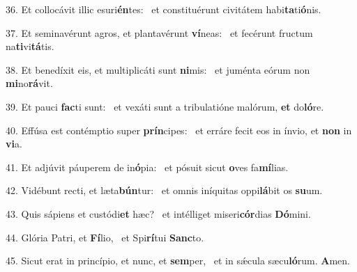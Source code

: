 36. Et collocávit illic esuri\textbf{én}tes: \ast\  et constituérunt civitátem habi\textbf{ta}ti\textbf{ó}nis.\

37. Et seminavérunt agros, et plantavérunt \textbf{ví}neas: \ast\  et fecérunt fructum na\textbf{ti}vi\textbf{tá}tis.\

38. Et benedíxit eis, et multiplicáti sunt \textbf{ni}mis: \ast\  et juménta eórum non \textbf{mi}no\textbf{rá}vit.\

39. Et pauci \textbf{fac}ti sunt: \ast\  et vexáti sunt a tribulatióne malórum, \textbf{et} do\textbf{ló}re.\

40. Effúsa est contémptio super \textbf{prín}cipes: \ast\  et erráre fecit eos in ínvio, et \textbf{non} in \textbf{vi}a.\

41. Et adjúvit páuperem de in\textbf{ó}pia: \ast\  et pósuit sicut \textbf{o}ves fa\textbf{mí}lias.\

42. Vidébunt recti, et læta\textbf{bún}tur: \ast\  et omnis iníquitas oppi\textbf{lá}bit os \textbf{su}um.\

43. Quis sápiens et custódi\textbf{et} hæc? \ast\  et intélliget miseri\textbf{cór}dias \textbf{Dó}mini.\

44. Glória Patri, et \textbf{Fí}lio, \ast\  et Spi\textbf{rí}tui \textbf{Sanc}to.\

45. Sicut erat in princípio, et nunc, et \textbf{sem}per, \ast\  et in sǽcula sæcu\textbf{ló}rum. \textbf{A}men.\


